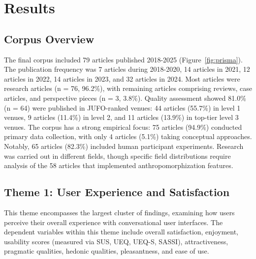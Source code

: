 \documentclass[manuscript,anonymous,sigconf]{acmart}
\begin{document}


\section{Results}

\subsection{Corpus Overview}

The final corpus included 79 articles published 2018-2025 (Figure~\ref{fig:prisma}). The publication frequency was 7 articles during 2018-2020, 14 articles in 2021, 12 articles in 2022, 14 articles in 2023, and 32 articles in 2024.
Most articles were research articles (n = 76, 96.2\%), with remaining articles comprising reviews, case articles, and perspective pieces (n = 3, 3.8\%). Quality assessment showed 81.0\% (n = 64) were published in JUFO-ranked venues: 44 articles (55.7\%) in level 1 venues, 9 articles (11.4\%) in level 2, and 11 articles (13.9\%) in top-tier level 3 venues.
The corpus has a strong empirical focus: 75 articles (94.9\%) conducted primary data collection, with only 4 articles (5.1\%) taking conceptual approaches. Notably, 65 articles (82.3\%) included human participant experiments. Research was carried out in different fields, though specific field distributions require analysis of the 58 articles that implemented anthropomorphization features.

\subsection{Theme 1: User Experience and Satisfaction}

This theme encompasses the largest cluster of findings, examining how users perceive their overall experience with conversational user interfaces. The dependent variables within this theme include overall satisfaction, enjoyment, usability scores (measured via SUS, UEQ, UEQ-S, SASSI), attractiveness, pragmatic qualities, hedonic qualities, pleasantness, and ease of use.
\end{document}
